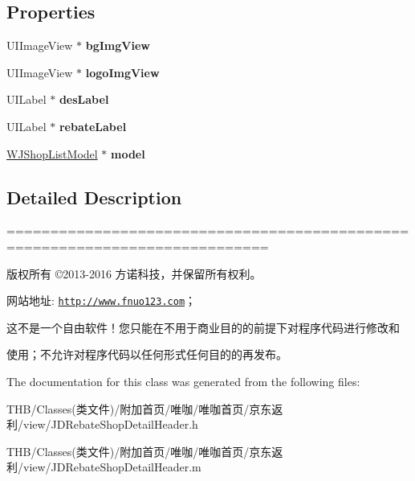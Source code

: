\subsection*{Properties}
\begin{DoxyCompactItemize}
\item 
\mbox{\label{interface_j_d_rebate_shop_detail_header_a77fee8fdeb7138aa075865667c138a4f}} 
U\+I\+Image\+View $\ast$ {\bfseries bg\+Img\+View}
\item 
\mbox{\label{interface_j_d_rebate_shop_detail_header_a2a8982004acf377890660a0af1d380b2}} 
U\+I\+Image\+View $\ast$ {\bfseries logo\+Img\+View}
\item 
\mbox{\label{interface_j_d_rebate_shop_detail_header_a9f202eeaccf1510e3a1c83e2ca42a8b5}} 
U\+I\+Label $\ast$ {\bfseries des\+Label}
\item 
\mbox{\label{interface_j_d_rebate_shop_detail_header_acea1f40ca5712b938f90c65030738a47}} 
U\+I\+Label $\ast$ {\bfseries rebate\+Label}
\item 
\mbox{\label{interface_j_d_rebate_shop_detail_header_abcac176d3097b5fbe83e573e17d1eb32}} 
\mbox{\hyperlink{interface_w_j_shop_list_model}{W\+J\+Shop\+List\+Model}} $\ast$ {\bfseries model}
\end{DoxyCompactItemize}


\subsection{Detailed Description}
============================================================================

版权所有 ©2013-\/2016 方诺科技，并保留所有权利。

网站地址\+: \href{http://www.fnuo123.com}{\tt http\+://www.\+fnuo123.\+com}； 



这不是一个自由软件！您只能在不用于商业目的的前提下对程序代码进行修改和

使用；不允许对程序代码以任何形式任何目的的再发布。 

 

The documentation for this class was generated from the following files\+:\begin{DoxyCompactItemize}
\item 
T\+H\+B/\+Classes(类文件)/附加首页/唯咖/唯咖首页/京东返利/view/J\+D\+Rebate\+Shop\+Detail\+Header.\+h\item 
T\+H\+B/\+Classes(类文件)/附加首页/唯咖/唯咖首页/京东返利/view/J\+D\+Rebate\+Shop\+Detail\+Header.\+m\end{DoxyCompactItemize}
